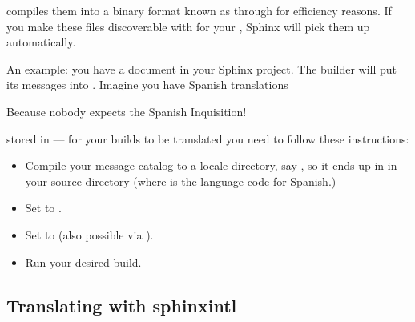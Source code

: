 \documentclass[letterpaper,10pt,english]{sphinxmanual}
\begin{document}
 compiles them into a binary format known as 
through  for efficiency reasons.  If you make these files
discoverable with  for your , Sphinx
will pick them up automatically.

An example: you have a document  in your Sphinx project.  The
 builder will put its messages into .  Imagine you have
Spanish translations %
\begin{footnote}[2]\sphinxAtStartFootnote
Because nobody expects the Spanish Inquisition!
%
\end{footnote} stored in  — for your builds to
be translated you need to follow these instructions:
\begin{itemize}
\item {} 
Compile your message catalog to a locale directory, say , so it
ends up in  in your source directory
(where  is the language code for Spanish.)

\begin{sphinxVerbatim}[commandchars=\\\{\}]
   
\end{sphinxVerbatim}

\item {} 
Set  to \sphinxcode{\sphinxupquote{{[}"locale/"{]}}}.

\item {} 
Set  to  (also possible via
).

\item {} 
Run your desired build.

\end{itemize}


\subsection{Translating with sphinx\sphinxhyphen{}intl}
\label{\detokenize{usage/advanced/intl:translating-with-sphinx-intl}}
\end{document}
